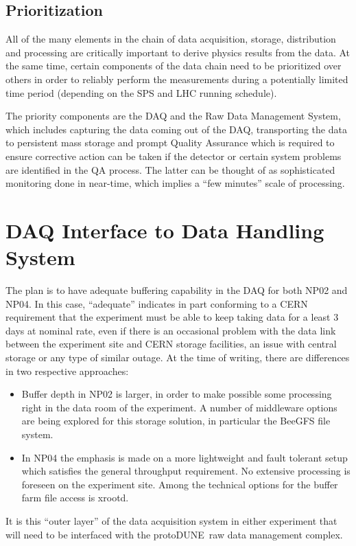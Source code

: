 \documentclass[pdftex,12pt,letter]{article}
\newcommand{\pd}{protoDUNE\ }
\begin{document}
\subsection{Prioritization}

All of the many elements in the chain of data acquisition, storage, distribution and processing are critically important to derive physics results  from the data.
At the same time, certain components of the data chain need to be prioritized over others in order to reliably perform the measurements during a potentially
limited time period (depending on the SPS and LHC running schedule).

The priority components are the DAQ and the Raw Data Management System, which includes capturing the data coming out of the DAQ,
transporting the data to persistent mass storage and prompt Quality Assurance which is required to ensure corrective action can be taken
if the detector or certain system problems are identified in the QA process. The latter can be thought of as sophisticated monitoring done in near-time,
which implies a ``few minutes'' scale of processing.


\section{DAQ Interface to Data Handling System}
\label{sec:daq_interface}
The plan is to have adequate buffering capability in the DAQ for both NP02 and NP04. In this case, “adequate” indicates in part conforming to a CERN requirement that the experiment must be able to keep taking data for a least 3 days at nominal rate, even if there is an occasional problem with the data link between the experiment site and CERN storage facilities, an issue with central storage or any type of similar outage. At the time of writing, there are differences in two respective approaches:
\begin{itemize}
\item Buffer depth in NP02 is larger, in order to make possible some processing right in the data room of the experiment. A number of middleware options are being explored for this storage solution, in particular the BeeGFS file system.

\item In NP04 the emphasis is made on a more lightweight and fault tolerant setup which satisfies the general throughput requirement. No extensive processing is foreseen on the experiment site. Among the technical options for the buffer farm file access is xrootd.
\end{itemize}
It is this ``outer layer'' of the data acquisition system in either experiment that will need to be interfaced with the \pd raw data management complex.
\end{document}
